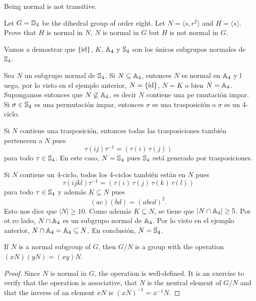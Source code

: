 Being normal is not transitive. 

\begin{exercise}
Let $G=\mathbb{D}_4$ be the dihedral group of order eight. Let $N=\langle s,r^2\rangle$ and $H=\langle s\rangle$.
Prove that $H$ is normal in $N$, $N$ is normal in $G$ but $H$ is not normal in $G$. 
\end{exercise}

\begin{example}
Vamos a demostrar que $\{\operatorname{id}\}$, $K$, $\mathbb{A}_4$ y $\mathbb{S}_4$ son los únicos subgrupos normales de $\mathbb{S}_
4$.

Sea $N$ un subgrupo normal de $\mathbb{S}_4$. Si $N\subseteq\mathbb{A}_4$, entonces $N$ es normal en $\mathbb{A}_4$ y l
uego, por lo visto en el ejemplo anterior, $N=\{\operatorname{id}\}$,
$N=K$ o bien $N=\mathbb{A}_4$. Supongamos entonces que $N\not\subseteq\mathbb{A}_4$, es decir $N$ contiene una pe
rmutación impar. Si $\sigma\in\mathbb{S}_4$ es una permutación impar, entonces $\sigma$ es una trasposición
 o $\sigma$ es un 4-ciclo.

Si $N$ contiene una trasposición, entonces todas las trasposiciones
también pertenecen a $N$ pues
\[
\tau(ij)\tau^{-1}=(\tau(i)\,\tau(j))
\]
para todo $\tau\in\mathbb{S}_4$. En este caso, $N=\mathbb{S}_4$ pues $\mathbb{S}_4$ está generado por trasposiciones.


Si $N$ contiene un 4-ciclo, todos los 4-ciclos también están en $N$ pues
\[
\tau(ijkl)\tau^{-1}=(\tau(i)\,\tau(j)\,\tau(k)\,\tau(l))
\]
para todo $\tau\in\mathbb{S}_4$ y además $K\subseteq N$ pues
\[
(ac)(bd)=(abcd)^2.
\]
Esto nos dice que $|N|\geq10$. Como además $K\subseteq N$, se tiene que $|N\cap\mathbb{A}_4|\geq 5$. Por ot
ro lado, $N\cap\mathbb{A}_4$ es un subgrupo normal de $\mathbb{A}_4$.
Por lo visto en el ejemplo anterior, $N\cap\mathbb{A}_4=\mathbb{A}_4\subseteq N$. En conclusión, $N=\mathbb{S}_4$.
\end{example}

\begin{theorem}
\label{Quotient group}
If $N$ is a normal subgroup of $G$, then
$G/N$ is a group with the operation 
$(xN)(yN)=(xy)N$.
\end{theorem}

\begin{proof}
Since $N$ is normal in $G$, the operation is well-defined. 
It is an exercise to verify that
the operation is associative, that
$N$ is the neutral element of $G/N$ and that 
the inverse of an element $xN$ is 
$(xN)^{-1}=x^{-1}N$. 
\end{proof}

